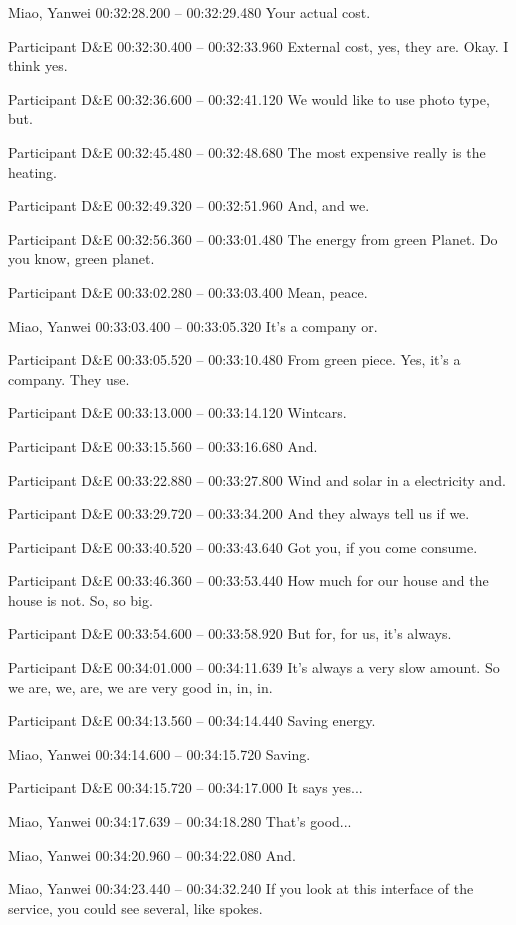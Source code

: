 {Miao, Yanwei 00:32:28.200 -- 00:32:29.480
Your actual cost.

Participant D\&E 00:32:30.400 -- 00:32:33.960
External cost, yes, they are. Okay. I think yes.

Participant D\&E 00:32:36.600 -- 00:32:41.120
We would like to use photo type, but.

Participant D\&E 00:32:45.480 -- 00:32:48.680
The most expensive really is the heating.

Participant D\&E 00:32:49.320 -- 00:32:51.960
And, and we.

Participant D\&E 00:32:56.360 -- 00:33:01.480
The energy from green Planet. Do you know, green planet.

Participant D\&E 00:33:02.280 -- 00:33:03.400
Mean, peace.

Miao, Yanwei 00:33:03.400 -- 00:33:05.320
It's a company or.

Participant D\&E 00:33:05.520 -- 00:33:10.480
From green piece. Yes, it's a company. They use.

Participant D\&E 00:33:13.000 -- 00:33:14.120
Wintcars.

Participant D\&E 00:33:15.560 -- 00:33:16.680
And.

Participant D\&E 00:33:22.880 -- 00:33:27.800
Wind and solar in a electricity and.

Participant D\&E 00:33:29.720 -- 00:33:34.200
And they always tell us if we.

Participant D\&E 00:33:40.520 -- 00:33:43.640
Got you, if you come consume.

Participant D\&E 00:33:46.360 -- 00:33:53.440
How much for our house and the house is not. So, so big.

Participant D\&E 00:33:54.600 -- 00:33:58.920
But for, for us, it's always.

Participant D\&E 00:34:01.000 -- 00:34:11.639
It's always a very slow amount. So we are, we, are, we are very good in, in, in.

Participant D\&E 00:34:13.560 -- 00:34:14.440
Saving energy.

Miao, Yanwei 00:34:14.600 -- 00:34:15.720
Saving.

Participant D\&E 00:34:15.720 -- 00:34:17.000
It says yes...

Miao, Yanwei 00:34:17.639 -- 00:34:18.280
That's good...

Miao, Yanwei 00:34:20.960 -- 00:34:22.080
And.

Miao, Yanwei 00:34:23.440 -- 00:34:32.240
If you look at this interface of the service, you could see several, like spokes.

}
